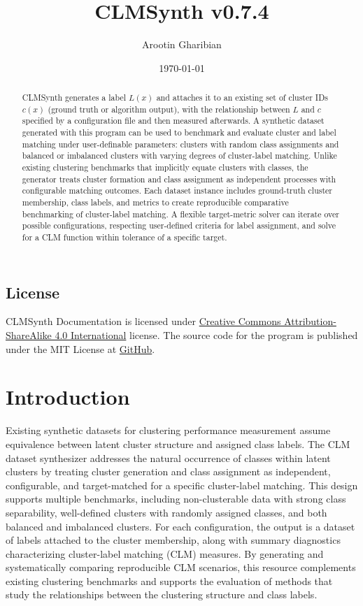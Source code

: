 \documentclass[a4paper,12pt]{article}
\title{CLMSynth v0.7.4}
\author{Arootin Gharibian}
\date{\today}
\begin{document}
\maketitle

\begin{abstract}
CLMSynth generates a label $L(x)$ and attaches it to an existing set of cluster IDs $c(x)$ (ground truth or algorithm output), with the relationship between $L$ and $c$ specified by a configuration file and then measured afterwards. A synthetic dataset generated with this program can be used to benchmark and evaluate cluster and label matching under user-definable parameters: clusters with random class assignments and balanced or imbalanced clusters with varying degrees of cluster-label matching. Unlike existing clustering benchmarks that implicitly equate clusters with classes, the generator treats cluster formation and class assignment as independent processes with configurable matching outcomes. Each dataset instance includes ground-truth cluster membership, class labels, and metrics to create reproducible comparative benchmarking of cluster-label matching. A flexible target-metric solver can iterate over possible configurations, respecting user-defined criteria for label assignment, and solve for a CLM function within tolerance of a specific target.

\end{abstract}

\subsection*{License}
CLMSynth Documentation is licensed under \href{https://creativecommons.org/licenses/by-sa/4.0/}{Creative Commons Attribution-ShareAlike 4.0 International} license. The source code for the program is published under the MIT License at \href{https://github.com/A-Gharibian/CLMSynth}{GitHub}.

\newpage
\section{Introduction}
Existing synthetic datasets for clustering performance measurement assume equivalence between latent cluster structure and assigned class labels. The CLM dataset synthesizer addresses the natural occurrence of classes within latent clusters by treating cluster generation and class assignment as independent, configurable, and target-matched for a specific cluster-label matching. This design supports multiple benchmarks, including non-clusterable data with strong class separability, well-defined clusters with randomly assigned classes, and both balanced and imbalanced clusters. For each configuration, the output is a dataset of labels attached to the cluster membership, along with summary diagnostics characterizing cluster-label matching (CLM) measures. By generating and systematically comparing reproducible CLM scenarios, this resource complements existing clustering benchmarks and supports the evaluation of methods that study the relationships between the clustering structure and class labels.
\end{document}
